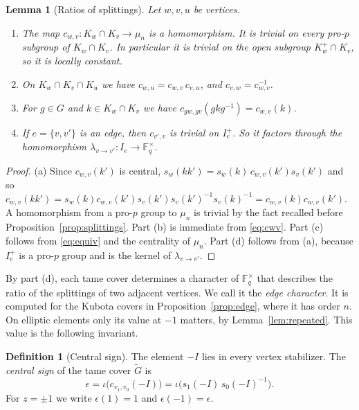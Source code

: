 \documentclass[12pt,letterpaper]{article}
\numberwithin{equation}{section}
\newtheorem{lemma}[theorem]{Lemma}
\theoremstyle{definition}
\newtheorem{definition}[theorem]{Definition}
\theoremstyle{remark}
\newcommand{\kk}{\mathbb F_q}
\newcommand{\Gt}{\widetilde G}
\newcommand{\sgn}{\epsilon}
\begin{document}
\begin{lemma}[Ratios of splittings]\label{lem:ratio}
Let $w,v,u$ be vertices.
\begin{enumerate}[label=(\alph*),leftmargin=2.2em]
\item The map $c_{w,v}:K_w\cap K_v\to\mu_n$ is a homomorphism. It is trivial on every pro-$p$ subgroup of $K_w\cap K_v$. In particular it is trivial on the open subgroup $K_w^+\cap K_v$, so it is locally constant.
\item On $K_w\cap K_v\cap K_u$ we have $c_{w,u}=c_{w,v}\,c_{v,u}$, and $c_{v,w}=c_{w,v}^{-1}$.
\item For $g\in G$ and $k\in K_w\cap K_v$ we have $c_{gw,gv}(gkg^{-1})=c_{w,v}(k)$.
\item If $e=\{v,v'\}$ is an edge, then $c_{v',v}$ is trivial on $I_e^+$. So it factors through the homomorphism $\lambda_{v\to v'}:I_e\to\kk^\times$.
\end{enumerate}
\end{lemma}
\begin{proof}
(a) Since $c_{w,v}(k')$ is central, $s_w(kk')=s_w(k)\,c_{w,v}(k')s_v(k')$ and so $c_{w,v}(kk')=s_w(k)c_{w,v}(k')s_v(k')s_v(k')^{-1}s_v(k)^{-1}=c_{w,v}(k)c_{w,v}(k')$. A homomorphism from a pro-$p$ group to $\mu_n$ is trivial by the fact recalled before Proposition~\ref{prop:splittings}. Part (b) is immediate from \eqref{eq:cwv}. Part (c) follows from \eqref{eq:equiv} and the centrality of $\mu_n$. Part (d) follows from (a), because $I_e^+$ is a pro-$p$ group and is the kernel of $\lambda_{v\to v'}$.
\end{proof}

By part (d), each tame cover determines a character of $\kk^\times$ that describes the ratio of the splittings of two adjacent vertices. We call it the \emph{edge character}. It is computed for the Kubota covers in Proposition~\ref{prop:edge}, where it has order $n$. On elliptic elements only its value at $-1$ matters, by Lemma~\ref{lem:repeated}. This value is the following invariant.

\begin{definition}[Central sign]\label{def:sign}
The element $-I$ lies in every vertex stabilizer. The \emph{central sign} of the tame cover $\Gt$ is
\[
 \sgn=\iota\bigl(c_{v_1,v_0}(-I)\bigr)=\iota\bigl(s_1(-I)\,s_0(-I)^{-1}\bigr).
\]
For $z=\pm1$ we write $\sgn(1)=1$ and $\sgn(-1)=\sgn$.
\end{definition}
\end{document}
